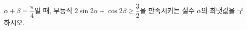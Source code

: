 $\alpha+\beta=\dfrac{\pi}{4}$일 때, 부등식 $2\sin 2\alpha+\cos 2\beta\ge\dfrac{3}{2}$을 만족시키는 실수 $\alpha$의 최댓값을 구하시오. 
